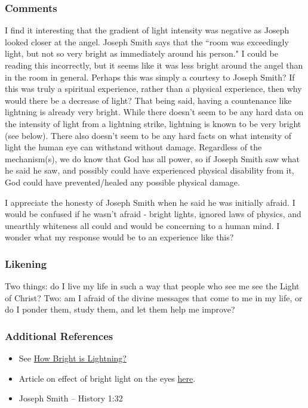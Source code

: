 \documentclass[12pt]{report}
\begin{document}
\subsubsection{Comments\label{js:comments5}}
I find it interesting that the gradient of light intensity was negative as Joseph looked closer at the angel.  Joseph Smith says that the ``room was exceedingly light, but not so very bright as immediately around his person."  I could be reading this incorrectly, but it seems like it was less bright around the angel than in the room in general.  Perhaps this was simply a courtesy to Joseph Smith?  If this was truly a spiritual experience, rather than a physical experience, then why would there be a decrease of light?  That being said, having a countenance like lightning is already very bright.  While there doesn't seem to be any hard data on the intensity of light from a lightning strike, lightning is known to be very bright (see  below).  There also doesn't seem to be any hard facts on what intensity of light the human eye can withstand without damage.  Regardless of the mechanism(s), we do know that God has all power, so if Joseph Smith saw what he said he saw, and possibly could have experienced physical disability from it, God could have prevented/healed any possible physical damage.

I appreciate the honesty of Joseph Smith when he said he was initially afraid.  I would be confused if he wasn't afraid - bright lights, ignored laws of physics, and unearthly whiteness all could and would be concerning to a human mind.  I wonder what my response would be to an experience like this?

\subsubsection{Likening\label{js:likening5}}
Two things: do I live my life in such a way that people who see me see the Light of Christ? Two: am I afraid of the divine messages that come to me in my life, or do I ponder them, study them, and let them help me improve?

\subsubsection{Additional References\label{js:references5}}
\begin{itemize}
\item See \href{http://academlib.com/5778/education/bright_lightning}{How Bright is Lightning?}
\item Article on effect of bright light on the eyes \href{https://www.quora.com/What-is-the-maximum-light-intensity-that-a-human-eye-can-withstand-without-being-damaged}{here}.
\item Joseph Smith -- History 1:32
\end{itemize}
\end{document}
